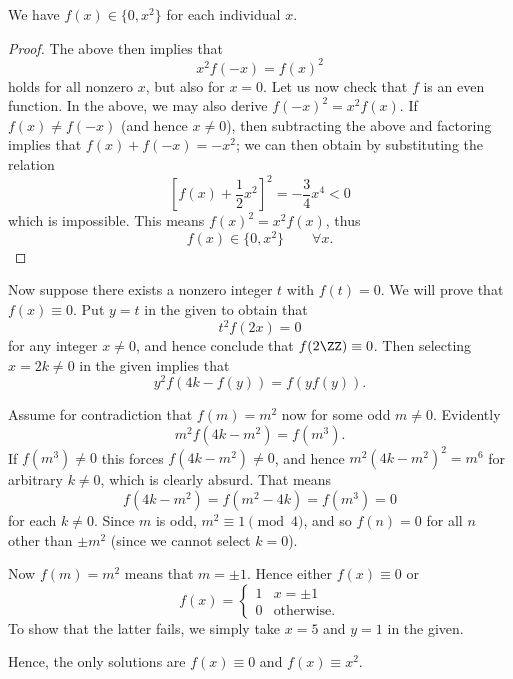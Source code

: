\documentclass[11pt]{scrartcl}
\begin{document}
\begin{claim*}
  We have $f(x) \in \{0,x^2\}$ for each individual $x$.
\end{claim*}
\begin{proof}
  The above then implies that
  \[ x^2f(-x) = f(x)^2 \]
  holds for all nonzero $x$, but also for $x=0$.
  Let us now check that $f$ is an even function.
  In the above, we may also derive $f(-x)^2 = x^2f(x)$.
  If $f(x) \neq f(-x)$ (and hence $x \neq 0$),
  then subtracting the above and factoring implies that
  $f(x) + f(-x) = -x^2$;
  we can then obtain by substituting the relation
  \[ \left[ f(x) + \frac 12x^2 \right]^2 = -\frac 34 x^4 < 0 \]
  which is impossible.
  This means $f(x)^2 = x^2f(x)$, thus
  \[ f(x) \in \{0, x^2\} \qquad \forall x. \]
\end{proof}

Now suppose there exists a nonzero integer $t$ with $f(t) = 0$.
We will prove that $f(x) \equiv 0$.
Put $y=t$ in the given to obtain that
\[ t^2 f(2x) = 0 \]
for any integer $x \neq 0$, and hence conclude that $f(2 \ZZ) \equiv 0$.
Then selecting $x = 2k \neq 0$ in the given implies that
\[ y^2 f(4k-f(y)) = f(yf(y)). \]

Assume for contradiction that $f(m) = m^2$ now for some odd $m \neq 0$.
Evidently \[ m^2 f(4k-m^2) = f(m^3). \]
If $f(m^3) \neq 0$ this forces $f(4k-m^2) \neq 0$,
and hence $m^2(4k-m^2)^2 = m^6$ for arbitrary $k \neq 0$, which is clearly absurd.
That means \[ f(4k-m^2) = f(m^2-4k) = f(m^3) = 0 \] for each $k \neq 0$.
Since $m$ is odd, $m^2 \equiv 1 \pmod 4$,
and so $f(n) = 0$ for all $n$ other than $\pm m^2$
(since we cannot select $k=0$).

Now $f(m) = m^2$ means that $m = \pm 1$.
Hence either $f(x) \equiv 0$ or
\[ f(x) = \begin{cases} 1 & x = \pm 1 \\ 0 & \text{otherwise}. \end{cases} \]
To show that the latter fails,
we simply take $x=5$ and $y=1$ in the given.

Hence, the only solutions are $f(x) \equiv 0$ and $f(x) \equiv x^2$.
\pagebreak
\end{document}

